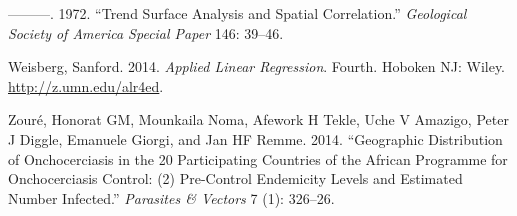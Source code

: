 \documentclass[
  letterpaper,
]{krantz}
\newlength{\cslhangindent}
\newlength{\cslentryspacingunit} %
\newenvironment{CSLReferences}[2] %
 {%
  \setlength{\parindent}{0pt}
  \ifodd #1
  \let\oldpar\par
  \def\par{\hangindent=\cslhangindent\oldpar}
  \fi
  \setlength{\parskip}{#2\cslentryspacingunit}
 }%
 {}
\begin{document}
\begin{CSLReferences}{1}{0}
\leavevmode{}%
---------. 1972. {``Trend Surface Analysis and Spatial Correlation.''}
\emph{Geological Society of America Special Paper} 146: 39--46.

\leavevmode{}%
Weisberg, Sanford. 2014. \emph{Applied Linear Regression}. Fourth.
Hoboken {NJ}: Wiley. \url{http://z.umn.edu/alr4ed}.

\leavevmode{}%
Zouré, Honorat GM, Mounkaila Noma, Afework H Tekle, Uche V Amazigo,
Peter J Diggle, Emanuele Giorgi, and Jan HF Remme. 2014. {``Geographic
Distribution of Onchocerciasis in the 20 Participating Countries of the
African Programme for Onchocerciasis Control: (2) Pre-Control Endemicity
Levels and Estimated Number Infected.''} \emph{Parasites \& Vectors} 7
(1): 326--26.

\end{CSLReferences}
\end{document}
